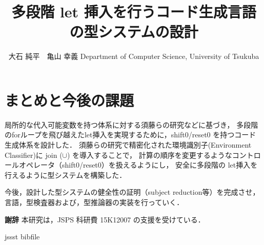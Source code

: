\documentclass[T]{compsoft}
\theoremstyle{break}
\begin{document}
\title{多段階 let 挿入を行うコード生成言語の型システムの設計}

%
\author{大石 純平　亀山 幸義
%
%
%
%
%
{Department of Computer Science, University of Tsukuba}}


\maketitle \thispagestyle {empty}







\section{まとめと今後の課題}
局所的な代入可能変数を持つ体系に対する須藤らの研究\cite{Sudo2014}などに基づき，
多段階のforループを飛び越えたlet挿入を実現するために，shift0/reset0 を持つコード生成体系を設計した．
須藤らの研究で精密化された環境識別子(Environment Classifier)に join ($\cup$) を導入することで，
計算の順序を変更するようなコントロールオペレータ（shift0/reset0）を扱えるようにし，
安全に多段階の let挿入を行えるように型システムを構築した．

今後，設計した型システムの健全性の証明（subject reduction等）を完成させ，
言語，型検査器および，型推論器の実装を行っていく．

{\bf 謝辞} 本研究は，JSPS 科研費 15K12007 の支援を受けている．


 {jssst}
 {bibfile}
\end{document}
